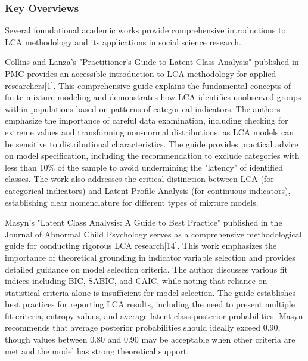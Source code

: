 \documentclass[main.tex]{subfiles}
\begin{document}
\subsubsection{Key Overviews}

Several foundational academic works provide comprehensive introductions to LCA methodology and its applications in social science research.

Collins and Lanza's "Practitioner's Guide to Latent Class Analysis" published in PMC provides an accessible introduction to LCA methodology for applied researchers[1]. This comprehensive guide explains the fundamental concepts of finite mixture modeling and demonstrates how LCA identifies unobserved groups within populations based on patterns of categorical indicators. The authors emphasize the importance of careful data examination, including checking for extreme values and transforming non-normal distributions, as LCA models can be sensitive to distributional characteristics. The guide provides practical advice on model specification, including the recommendation to exclude categories with less than 10\% of the sample to avoid undermining the "latency" of identified classes. The work also addresses the critical distinction between LCA (for categorical indicators) and Latent Profile Analysis (for continuous indicators), establishing clear nomenclature for different types of mixture models.

Masyn's "Latent Class Analysis: A Guide to Best Practice" published in the Journal of Abnormal Child Psychology serves as a comprehensive methodological guide for conducting rigorous LCA research[14]. This work emphasizes the importance of theoretical grounding in indicator variable selection and provides detailed guidance on model selection criteria. The author discusses various fit indices including BIC, SABIC, and CAIC, while noting that reliance on statistical criteria alone is insufficient for model selection. The guide establishes best practices for reporting LCA results, including the need to present multiple fit criteria, entropy values, and average latent class posterior probabilities. Masyn recommends that average posterior probabilities should ideally exceed 0.90, though values between 0.80 and 0.90 may be acceptable when other criteria are met and the model has strong theoretical support.
\end{document}
